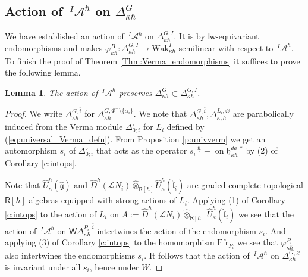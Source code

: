 \documentclass{amsart}
\newtheorem{Lem}[Thm]{Lemma}
\theoremstyle{definition}
\newcommand{\on}{\mathrm}
\newcommand{\Ring}{\mathsf{R}}
\newcommand{\g}{\mathfrak{g}}
\newcommand{\h}{\mathfrak{h}}
\newcommand{\Wak}{\on{Wak}}
\newcommand{\lf}{\mathfrak{l}}
\newcommand{\A}{\mathscr{A}}
\newcommand{\Loop}{\mathscr{L}}
\newcommand{\Iw}{\mathsf{Iw}}
\newcommand{\WakDelta}{\mathsf{W}\Delta}
\newcommand{\Ffr}{\mathrm{{Ffr}}}
\numberwithin{equation}{section}
\begin{document}
\subsection{Action of $\,^I\!\A^\hbar$ on $\Delta^G_{\kappa\hbar}$}
We have established an action of $\,^I\!\A^\hbar$ on $\Delta^{G,I}_{\kappa\hbar}$. It is by $\Iw$-equivariant endomorphisms and makes 
$\varphi^B_{\kappa\hbar}: \Delta^{G,I}_{\kappa\hbar}\rightarrow \Wak^I_{\kappa\hbar}$ semilinear with respect to $\,^I\!\A^\hbar$. To finish the proof of Theorem \ref{Thm:Verma_endomorphisms} it suffices to prove the following lemma.

\begin{Lem} The action of $\,^I\!\A^\hbar$ preserves $\Delta^{G}_{\kappa\hbar}\subset \Delta^{G,I}_{\kappa\hbar}$.
\end{Lem}
\begin{proof} We write $\Delta^{G,\overline{i}}_{\kappa\hbar}$ for 
$\Delta^{G,\Phi^+\setminus \{\alpha_i\}}_{\kappa\hbar}$. We note that $\Delta^{G,\overline{i}}_{\kappa\hbar}, 
\Delta^{L_i,\varnothing}_{\kappa,\hbar}$ are parabolically induced from the Verma module
$\Delta^\circ_{0; i}$ for $L_i$ defined by (\ref{eq:universal_Verma_defn}). From Proposition \ref{p:univverm} we get an automorphism $s_i$ of $\Delta^\circ_{0; i}$ that acts as the operator $s_i\overset{\hbar}\cdot-$ on $\h^{da,*}_{\kappa\hbar}$ by (2) of 
Corollary \ref{c:intops}. 

{ Note that $\widehat{U}^\hbar_{\kappa}(\hat{\g})$ and $\widehat{D}^\hbar(\Loop N_i)\widehat{\otimes}_{\Ring[\hbar]}\widehat{U}^\hbar_{\kappa}(\hat{\lf}_i)$ are graded complete topological $\Ring[\hbar]$-algebras equipped with strong actions of $L_i$.} Applying (1) of Corollary \ref{c:intops} to the action of $L_i$ on 
$A:=\widehat{D}^\hbar(\Loop N_i)\widehat{\otimes}_{\Ring[\hbar]}\widehat{U}^\hbar_{\kappa}(\hat{\lf}_i)$ we see that the action of $\,^I\!\A^\hbar$ on $\WakDelta^{P_i,\overline{i}}_{\kappa\hbar}$ intertwines the action of the endomorphism $s_i$. And applying (3) of Corollary \ref{c:intops} to the homomorphism $\Ffr_{P_i}$ we see that $\varphi^{P_i}_{\kappa\hbar}$ also intertwines the endomorphisms $s_i$. It follows that the action of $\,^I\!\A^\hbar$ on
$\Delta^{G,\varnothing}_{\kappa\hbar}$ is invariant under all $s_i$, hence under $W$. 


\end{proof}
\end{document}
